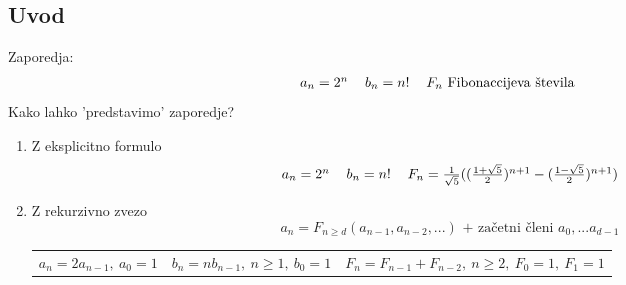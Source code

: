 \documentclass[a4paper,12pt]{article}
\theoremstyle{definition}
\theoremstyle{remark}
\begin{document}
\subsection{Uvod}
Zaporedja:
\[\begin{tabular}{c c c}
    $a_n = 2^n$ & $b_n = n!$ & $F_n$ Fibonaccijeva števila
\end{tabular}\]
Kako lahko 'predstavimo' zaporedje?
\begin{enumerate}
    \item Z eksplicitno formulo\\
    \[\begin{tabular}{c c c}
    $a_n = 2^n$ & $b_n = n!$ & $F_n = \frac{1}{\sqrt{5}}((\frac{1 + \sqrt{5}}{2})^{n + 1} - (\frac{1 - \sqrt{5}}{2})^{n + 1})$
    \end{tabular}\]
    \item Z rekurzivno zvezo\\
    \[a_n = F_{n \geqslant d} (a_{n - 1}, a_{n - 2}, ...)\text{ + začetni členi }a_0, ... a_{d - 1}\]
    
    
    \begin{tabular}{c c c}
    $a_n = 2a_{n-1}, \ a_0 = 1$ & $b_n = nb_{n - 1}, \ n \geqslant 1, \ b_0 = 1$ & $F_n = F_{n - 1} + F_{n - 2}, \ n \geqslant 2, \ F_0 = 1, \ F_1 = 1$
    \end{tabular}
    

\end{enumerate}
\end{document}
